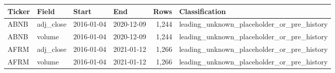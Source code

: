 \begin{tabular}{@{}llllrl@{}}
\toprule
Ticker & Field & Start & End & Rows & Classification \\
\midrule
ABNB & adj\_\allowbreak{}close & 2016-01-04 & 2020-12-09 & 1,244 & leading\_\allowbreak{}unknown\_\allowbreak{}placeholder\_\allowbreak{}or\_\allowbreak{}pre\_\allowbreak{}history \\
ABNB & volume & 2016-01-04 & 2020-12-09 & 1,244 & leading\_\allowbreak{}unknown\_\allowbreak{}placeholder\_\allowbreak{}or\_\allowbreak{}pre\_\allowbreak{}history \\
AFRM & adj\_\allowbreak{}close & 2016-01-04 & 2021-01-12 & 1,266 & leading\_\allowbreak{}unknown\_\allowbreak{}placeholder\_\allowbreak{}or\_\allowbreak{}pre\_\allowbreak{}history \\
AFRM & volume & 2016-01-04 & 2021-01-12 & 1,266 & leading\_\allowbreak{}unknown\_\allowbreak{}placeholder\_\allowbreak{}or\_\allowbreak{}pre\_\allowbreak{}history \\
\bottomrule
\end{tabular}
